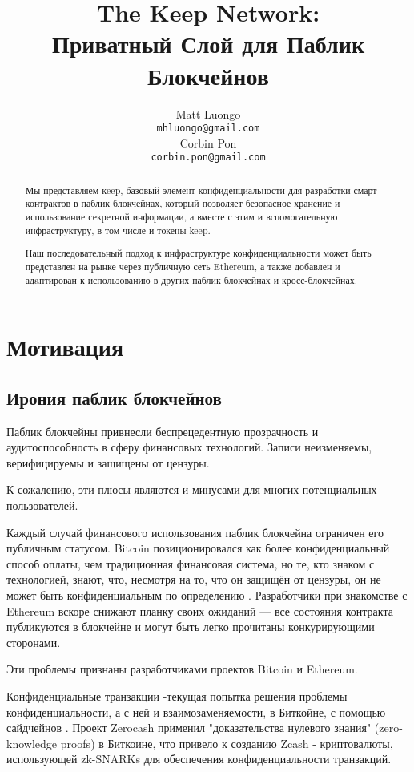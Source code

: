 \documentclass[english,11pt]{article}
\title{The Keep Network:\protect\\Приватный Слой для Паблик Блокчейнов}
\author{Matt Luongo \\
  {\tt mhluongo@gmail.com} \\\And
  Corbin Pon \\
  {\tt corbin.pon@gmail.com} \\}
\date{}
\begin{document}
\thispagestyle{fancy}

\maketitle

\begin{abstract}

  Мы представляем кeep, базовый элемент конфиденциальности 
  для разработки смарт-контрактов в паблик блокчейнах, который 
  позволяет безопасное хранение и использование секретной 
  информации, а вместе с этим и вспомогательную  инфраструктуру, 
  в том числе и токены keep.

  Наш последовательный подход к инфраструктуре конфиденциальности 
  может быть представлен на рынке через публичную сеть Ethereum, 
  а также добавлен и адaптирован к использованию в других 
  паблик блокчейнах и кросс-блокчейнах.

\end{abstract}

\section{Мотивация}

\subsection{Ирония паблик блокчейнов}

Паблик блокчейны привнесли беспрецедентную прозрачность и 
аудитоспособность в сферу финансовых технологий. 
Записи неизменяемы, верифицируемы и защищены от цензуры.

К сожалению, эти плюсы являются и минусами для многих потенциальных 
пользователей. 

Каждый  случай финансового использования паблик блокчейна ограничен 
его публичным статусом. Bitcoin позиционировался как более 
конфиденциальный способ оплаты, чем традиционная финансовая система, 
но те, кто знаком с технологией, знают, что, несмотря на то, что 
он защищён от цензуры, он не может быть конфиденциальным по 
определению \cite{bitcoinPrivacy}. Разработчики при знакомстве с 
Ethereum вскоре снижают планку своих ожиданий \cite{ethereumStackexchange}— 
все состояния контракта публикуются в блокчейне и могут быть легко 
прочитаны конкурирующими сторонами.

Эти проблемы признаны разработчиками проектов Bitcoin и Ethereum.

Конфиденциальные транзакции \cite{confidentialTransactions}-текущая 
попытка решения проблемы конфиденциальности, а с ней и 
взаимозаменяемости, в Биткойне, с помощью сайдчейнов \cite{confidentialTransactionsElements}. 
Проект Zerocash \cite{zerocash} применил "доказательства нулевого 
знания" (zero-knowledge proofs) в Биткоине, что привело к созданию 
Zcash \cite{zcash}- криптовалюты, использующей zk-SNARKs для 
обеспечения конфиденциальности транзакций.
\end{document}

